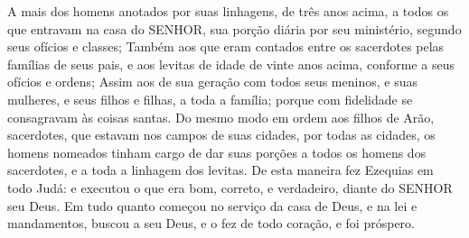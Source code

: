 {A mais dos homens anotados por suas linhagens, de três anos acima, a todos os que entravam na casa do SENHOR, sua porção diária por seu ministério, segundo seus ofícios e classes;
Também aos que eram contados entre os sacerdotes pelas famílias de seus pais, e aos levitas de idade de vinte anos acima, conforme a seus ofícios e ordens;
Assim aos de sua geração com todos seus meninos, e suas mulheres, e seus filhos e filhas, a toda a família; porque com fidelidade se consagravam às coisas santas.
Do mesmo modo em ordem aos filhos de Arão, sacerdotes, que estavam nos campos de suas cidades, por todas as cidades, os homens nomeados tinham cargo de dar suas porções a todos os homens dos sacerdotes, e a toda a linhagem dos levitas.
De esta maneira fez Ezequias em todo Judá: e executou o que era bom, correto, e verdadeiro, diante do SENHOR seu Deus.
Em tudo quanto começou no serviço da casa de Deus, e na lei e mandamentos, buscou a seu Deus, e o fez de todo coração, e foi próspero.

}
